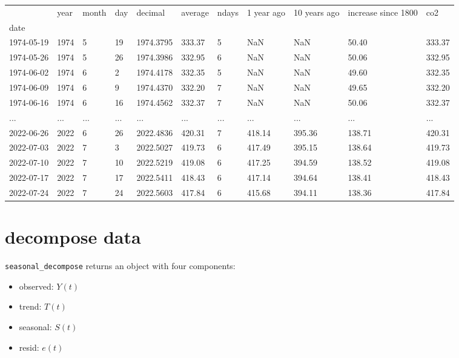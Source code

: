 \documentclass[
  letterpaper,
  DIV=11,
  numbers=noendperiod,
  oneside]{scrreprt}
\providecommand{\tightlist}{%
  \setlength{\itemsep}{0pt}\setlength{\parskip}{0pt}}\usepackage{longtable,booktabs,array}
\begin{document}
\begin{longtable}[]{@{}lllllllllll@{}}
\toprule()
& year & month & day & decimal & average & ndays & 1 year ago & 10 years
ago & increase since 1800 & co2 \\
date & & & & & & & & & & \\
\midrule()
\endhead
1974-05-19 & 1974 & 5 & 19 & 1974.3795 & 333.37 & 5 & NaN & NaN & 50.40
& 333.37 \\
1974-05-26 & 1974 & 5 & 26 & 1974.3986 & 332.95 & 6 & NaN & NaN & 50.06
& 332.95 \\
1974-06-02 & 1974 & 6 & 2 & 1974.4178 & 332.35 & 5 & NaN & NaN & 49.60 &
332.35 \\
1974-06-09 & 1974 & 6 & 9 & 1974.4370 & 332.20 & 7 & NaN & NaN & 49.65 &
332.20 \\
1974-06-16 & 1974 & 6 & 16 & 1974.4562 & 332.37 & 7 & NaN & NaN & 50.06
& 332.37 \\
... & ... & ... & ... & ... & ... & ... & ... & ... & ... & ... \\
2022-06-26 & 2022 & 6 & 26 & 2022.4836 & 420.31 & 7 & 418.14 & 395.36 &
138.71 & 420.31 \\
2022-07-03 & 2022 & 7 & 3 & 2022.5027 & 419.73 & 6 & 417.49 & 395.15 &
138.64 & 419.73 \\
2022-07-10 & 2022 & 7 & 10 & 2022.5219 & 419.08 & 6 & 417.25 & 394.59 &
138.52 & 419.08 \\
2022-07-17 & 2022 & 7 & 17 & 2022.5411 & 418.43 & 6 & 417.14 & 394.64 &
138.41 & 418.43 \\
2022-07-24 & 2022 & 7 & 24 & 2022.5603 & 417.84 & 6 & 415.68 & 394.11 &
138.36 & 417.84 \\
\bottomrule()
\end{longtable}

\hypertarget{decompose-data}{%
\section{decompose data}\label{decompose-data}}

\texttt{seasonal\_decompose} returns an object with four components:

\begin{itemize}
\tightlist
\item
  observed: \(Y(t)\)
\item
  trend: \(T(t)\)
\item
  seasonal: \(S(t)\)
\item
  resid: \(e(t)\)
\end{itemize}
\end{document}
